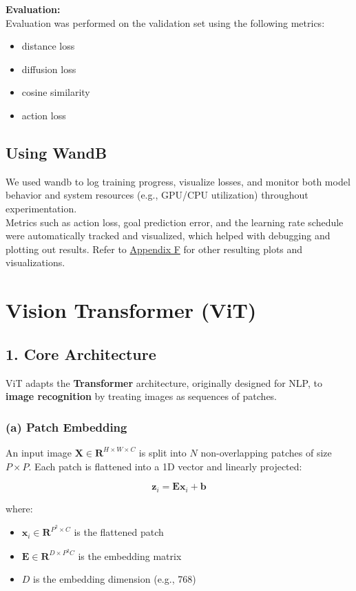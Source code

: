\documentclass[12pt]{article}
\begin{document}
\begin{appendices}
\noindent \textbf{Evaluation:}\\
Evaluation was performed on the validation set using the following metrics:
\begin{itemize}
    \item distance loss
    \item diffusion loss
    \item cosine similarity
    \item action loss
\end{itemize}

\subsection{Using WandB}
We used wandb to log training progress, visualize losses, and monitor both model behavior and system resources (e.g., GPU/CPU utilization)
throughout experimentation. \\
Metrics such as action loss, goal prediction error, and the learning rate schedule were automatically tracked and visualized, which helped with debugging and plotting out results.
Refer to \hyperref[app:wandb]{Appendix F} for other resulting plots and visualizations.\\

\section{Vision Transformer (ViT)}
\label{app:vit}

\subsection*{1. Core Architecture}
ViT adapts the \textbf{Transformer} architecture, originally designed for NLP, to \textbf{image recognition} by treating images as sequences of patches.

\subsubsection*{(a) Patch Embedding}
An input image $\mathbf{X} \in \mathbf{R}^{H \times W \times C}$ is split into $N$ non-overlapping patches of size $P \times P$. Each patch is flattened into a 1D vector and linearly projected:

\[
\mathbf{z}_i = \mathbf{E} \mathbf{x}_i + \mathbf{b}
\]

where:
\begin{itemize}
    \item $\mathbf{x}_i \in \mathbf{R}^{P^2 \times C}$ is the flattened patch
    \item $\mathbf{E} \in \mathbf{R}^{D \times P^2 C}$ is the embedding matrix
    \item $D$ is the embedding dimension (e.g., 768)
\end{itemize}


\end{appendices}
\end{document}
